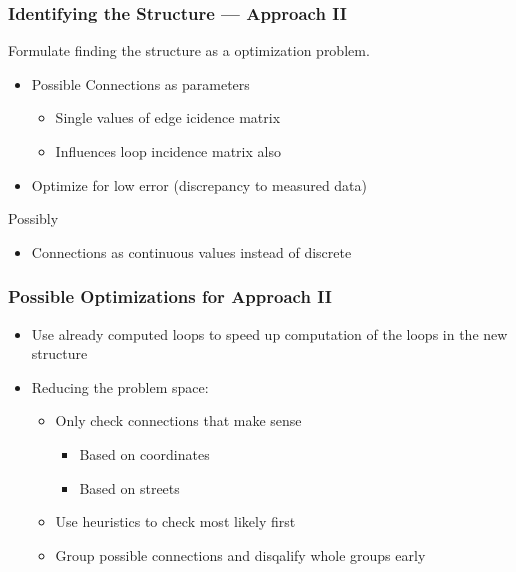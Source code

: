 \documentclass{beamer}
\begin{document}
\begin{frame}
\frametitle{Identifying the Structure --- Approach II}
  Formulate finding the structure as a optimization problem.

  \vspace{2em}

  \begin{itemize}
    \item Possible Connections as parameters
      \begin{itemize}
        \item Single values of edge icidence matrix
        \item Influences loop incidence matrix also
      \end{itemize}
    \item Optimize for low error (discrepancy to measured data)
  \end{itemize}

  \vspace{2em}

  Possibly
  \begin{itemize}
    \item Connections as continuous values instead of discrete
  \end{itemize}
\end{frame}

\begin{frame}
\frametitle{Possible Optimizations for Approach II}
  \begin{itemize}
    \item Use already computed loops to speed up computation of the loops in the new structure
    \item Reducing the problem space:
    \begin{itemize}
      \item Only check connections that make sense
        \begin{itemize}
          \item Based on coordinates
          \item Based on streets
        \end{itemize}
      \item Use heuristics to check most likely first
      \item Group possible connections and disqalify whole groups early
    \end{itemize}
  \end{itemize}
\end{frame}
\end{document}
